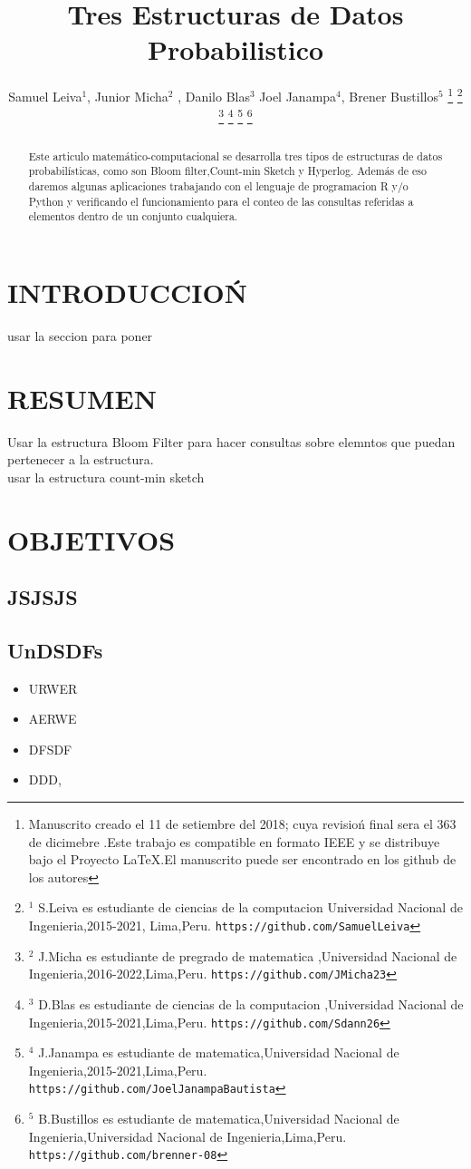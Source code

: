 \documentclass[letterpaper, 10 pt, conference]{ieeeconf}
\title{\LARGE \bf Tres Estructuras de Datos Probabilistico
}
\author{Samuel Leiva$^{1}$, Junior Micha$^{2}$ , Danilo Blas$^{3}$ Joel Janampa$^{4}$, Brener Bustillos$^{5}$%
\thanks{Manuscrito creado el 11 de setiembre del 2018; cuya revisio\'n final sera el 363 de dicimebre .Este trabajo es compatible en formato IEEE y se distribuye bajo el Proyecto LaTeX.El manuscrito puede ser encontrado en los github de los autores}%
\thanks{$^{1}$ S.Leiva es estudiante de ciencias de la computacion 
        Universidad Nacional de Ingenieria,2015-2021, Lima,Peru.
        {\tt\small https://github.com/SamuelLeiva}}%
\thanks{$^{2}$ J.Micha es estudiante de pregrado de matematica ,Universidad Nacional de Ingenieria,2016-2022,Lima,Peru.
        {\tt\small https://github.com/JMicha23}}%
\thanks{$^{3}$ D.Blas es estudiante de ciencias de la computacion ,Universidad Nacional de Ingenieria,2015-2021,Lima,Peru.
        {\tt\small https://github.com/Sdann26}}%
\thanks{$^{4}$ J.Janampa es estudiante de matematica,Universidad Nacional de Ingenieria,2015-2021,Lima,Peru.
        {\tt\small https://github.com/JoelJanampaBautista}}%
\thanks{$^{5}$ B.Bustillos es estudiante de matematica,Universidad Nacional de Ingenieria,Universidad Nacional de Ingenieria,Lima,Peru. 
        {\tt\small https://github.com/brenner-08}}%
}
\begin{document}
\maketitle
\thispagestyle{empty}
\pagestyle{empty}


\begin{abstract}
    

Este articulo matemático-computacional se desarrolla tres tipos de estructuras de datos probabilísticas, como son Bloom ﬁlter,Count-min Sketch y Hyperlog. Además de eso daremos algunas aplicaciones trabajando con el lenguaje de programacion R y/o Python y verificando el funcionamiento para el conteo de las consultas referidas a elementos dentro de un conjunto cualquiera.

\end{abstract}


\section{INTRODUCCIO\'N}

usar la seccion para poner 

\section{RESUMEN}
Usar la estructura Bloom Filter para hacer consultas sobre elemntos que puedan pertenecer a la estructura.\\
usar la estructura count-min sketch 

\section{OBJETIVOS}


\subsection{JSJSJS}

\subsection{UnDSDFs}

\begin{itemize}

\item URWER 
\item AERWE
\item DFSDF
\item DDD, 

\end{itemize}
\end{document}
